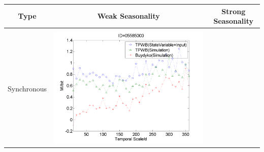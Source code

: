 \documentclass[review]{elsarticle}
\begin{document}
\begin{table}[H]\small
\label{sm}
\resizebox{\textwidth}{!}
{
\centering
\begin{tabular}{ccc}
\hline
Type& Weak Seasonality & Strong Seasonality \\\hline
\\
Synchronous
&\begin{minipage}{.6\textwidth}\includegraphics[width=\linewidth]{resultgraph/05585000MI.png}\end{minipage}


\end{tabular}}
\end{table}
\end{document}
